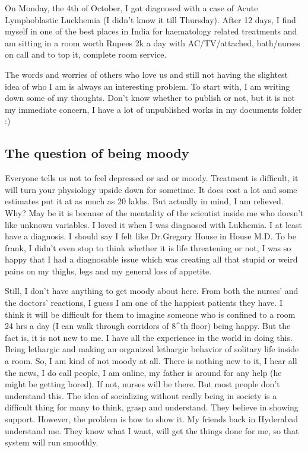 \vskip 2pt

On Monday, the 4th of October, I got diagnosed with a case of Acute Lymphoblastic Luckhemia 
(I didn't know it till Thursday). After 12 days, I find myself in one of the best places in
 India for haematology related treatments and am sitting in a room worth Rupees 2k a day
 with AC/TV/attached, bath/nurses on call and to top it, complete room service.

The words and worries of others who love us and still not having the slightest idea of
 who I am is always an interesting problem. To start with, I am writing down some of
 my thoughts. Don't know whether to publish or not, but it is not my immediate concern,
 I have a lot of unpublished works in my documents folder :)

\subsection*{The question of being moody} 

Everyone tells us not to feel depressed or sad or moody. Treatment is difficult, it 
will turn your physiology upside down for sometime. It does cost a lot and some 
estimates put it at as much as 20 lakhs. But actually in mind, I am relieved. Why? May 
be it is because of the mentality of the scientist inside me who doesn't like unknown variables. I loved
 it when I was diagnosed with Lukhemia. I at least have a diagnosis. I should say I 
felt like Dr.Gregory House in House M.D. To be frank, I didn't even stop to think whether
 it is life threatening or not, I was so happy that I had a diagnosable issue which was 
creating all that stupid or weird pains on my thighs, legs and my general loss of appetite.

Still, I don't have anything to get moody about here. From both the nurses' and the doctors' reactions, I guess
I am one of the happiest patients they have. I think it will be difficult for them to 
imagine someone who is confined to a room 24 hrs a day (I can walk through corridors of
 8^{th} floor) being happy. But the fact is, it is not new to me. I have all the experience in 
the world in doing this. Being lethargic and making an organized lethargic behavior of
solitary life inside a room. So, I am kind of not moody at all. There is nothing new to it,
I hear all the news, I do call people, I am online, my father is around for any help (he might
be getting bored). If not, nurses will be there. But most people don't understand this. The
idea of socializing without really being in society is a difficult thing for many to think, 
grasp and understand. They believe in showing support. However, the problem is how to show it. My 
friends back in Hyderabad understand me. They know what I want, will get the things done for
me, so that system will run smoothly. 

